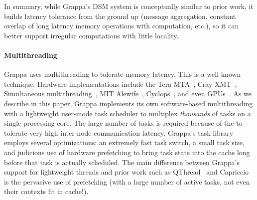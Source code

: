 In summary, while Grappa's DSM system is conceptually similar to prior work,
it builds latency tolerance from the ground up (message aggregation, constant
overlap of long latency memory operations with computation, etc.), so it can
better support irregular computations with little locality.




\paragraph{Multithreading} Grappa uses multithreading to tolerate memory
latency. This is a well known technique. Hardware implementations include the
Tera MTA~\cite{tera:mta1}, Cray XMT~\cite{feo:xmt}, Simultaneous
multithreading~\cite{tullsen:smt}, MIT Alewife~\cite{agarwal:alewife},
Cyclops~\cite{almasi:cyclops}, and even GPUs~\cite{gpus}. As we describe in
this paper, Grappa implements its own software-based multithreading with a
lightweight user-mode task scheduler to multiplex \emph{thousands\/} of tasks
on a single processing core. The large number of tasks is required because of
the to tolerate very high inter-node communication latency. Grappa's task
library employs several optimizations: an extremely fast task switch, a small
task size, and judicious use of hardware prefetching to bring task state into
the cache long before that task is actually scheduled. The main difference between Grappa's support for lightweight threads and prior work such as QThread~\cite{Wheeler08qthreads:an} and Capriccio~\cite{Behren03capriccio:scalable} is the pervasive use of prefetching (with a large number of active tasks, not even their contexts fit in cache!).

